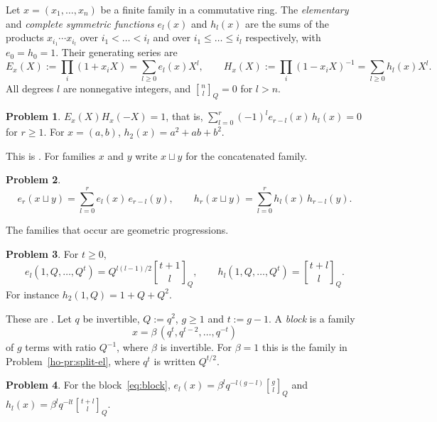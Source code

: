 \documentclass[reqno]{amsart}
\theoremstyle{definition}
\newtheorem{problem}{Problem}[section]
\theoremstyle{plain}
\theoremstyle{remark}
\newcommand{\qbinom}[3]{\genfrac{[}{]}{0pt}{}{#1}{#2}_{#3}}
\begin{document}
Let \(x = (x_1, \dots, x_n)\) be a finite family in a commutative ring.  The \emph{elementary} and \emph{complete symmetric functions} \(e_l(x)\) and \(h_l(x)\) are the sums of the products \(x_{i_1} \cdots x_{i_l}\) over \(i_1 < \dots < i_l\) and over \(i_1 \le \dots \le i_l\) respectively, with \(e_0 = h_0 = 1\).  Their generating series are
\[
  E_x(X) := \prod_{i} (1 + x_i X) = \sum_{l \ge 0} e_l(x) X^l , \qquad
  H_x(X) := \prod_{i} (1 - x_i X)^{-1} = \sum_{l \ge 0} h_l(x) X^l .
\]
All degrees \(l\) are nonnegative integers, and \(\qbinom{n}{l}{Q} = 0\) for \(l > n\).

\begin{problem}\label{pr:EH}
\(E_x(X) H_x(-X) = 1\), that is, \(\sum_{l=0}^r (-1)^l e_{r-l}(x)\, h_l(x) = 0\) for \(r \ge 1\).  For \(x = (a, b)\), \(h_2(x) = a^2 + ab + b^2\).
\end{problem}

This is \cite[Ch.~I, (2.6)]{Mac}.  For families \(x\) and \(y\) write \(x \sqcup y\) for the concatenated family.

\begin{problem}\label{pr:union}
\[
  e_r(x \sqcup y) = \sum_{l=0}^r e_l(x)\, e_{r-l}(y) , \qquad h_r(x \sqcup y) = \sum_{l=0}^r h_l(x)\, h_{r-l}(y) .
\]
\end{problem}

The families that occur are geometric progressions.

\begin{problem}\label{pr:geom}
For \(t \ge 0\),
\[
  e_l(1, Q, \dots, Q^t) = Q^{l(l-1)/2} \qbinom{t+1}{l}{Q} , \qquad h_l(1, Q, \dots, Q^t) = \qbinom{t+l}{l}{Q} .
\]
For instance \(h_2(1, Q) = 1 + Q + Q^2\).
\end{problem}

These are \cite[Ch.~I, \S2, Example~3]{Mac}.  Let \(q\) be invertible, \(Q := q^2\), \(g \ge 1\) and \(t := g - 1\).  A \emph{block} is a family
\begin{equation}\label{eq:block}
  x = \beta\,(q^t, q^{t-2}, \dots, q^{-t})
\end{equation}
of \(g\) terms with ratio \(Q^{-1}\), where \(\beta\) is invertible.  For \(\beta = 1\) this is the family in Problem~\ref{ho-pr:split-el}, where \(q^t\) is written \(Q^{t/2}\).

\begin{problem}\label{pr:sym-block}
For the block~\eqref{eq:block}, \(e_l(x) = \beta^l q^{-l(g-l)} \qbinom{g}{l}{Q}\) and \(h_l(x) = \beta^l q^{-lt} \qbinom{t+l}{l}{Q}\).
\end{problem}
\end{document}

